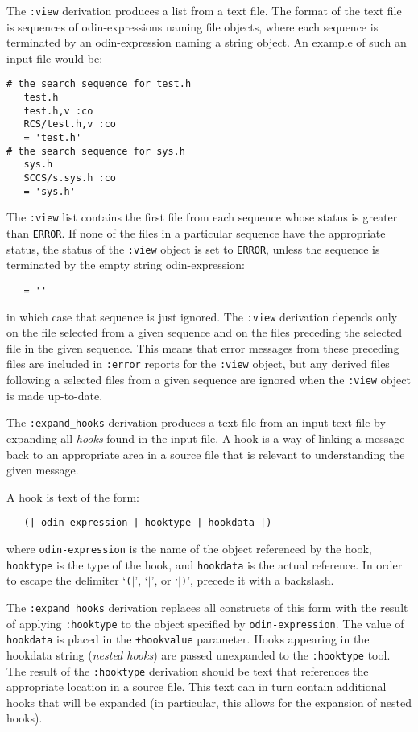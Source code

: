 \documentclass[hidelinks]{report}
\newcommand{\ex}{\tt}   %
\begin{document}
The {\ex :view} derivation produces a list from a text file.
The format of the text file is sequences of odin-expressions
naming file objects, where each sequence is terminated by
an odin-expression naming a string object.
An example of such an input file would be:
\begin{verbatim}
# the search sequence for test.h
   test.h
   test.h,v :co
   RCS/test.h,v :co
   = 'test.h'
# the search sequence for sys.h
   sys.h
   SCCS/s.sys.h :co
   = 'sys.h'
\end{verbatim}
The {\ex :view} list contains the first file from each sequence
whose status is greater than {\ex ERROR}.
If none of the files in a particular sequence have the appropriate
status, the status of the {\ex :view} object is set to {\ex ERROR},
unless the sequence is terminated by the empty string odin-expression:
\begin{verbatim}
   = ''
\end{verbatim}
in which case that sequence is just ignored.
The {\ex :view} derivation depends only on the file selected
from a given sequence and on the files preceding the
selected file in the given sequence.
This means that error messages from these preceding files
are included in {\ex :error} reports for the {\ex :view} object,
but any derived files following a selected files
from a given sequence are ignored when the {\ex :view}
object is made up-to-date.

The {\ex :expand\_hooks} derivation produces a text file
from an input text file by expanding all {\em hooks} found in the input file.
A hook is a way of linking a message back to an appropriate area
in a source file that is relevant to understanding the given message.

A hook is text of the form:
\begin{verbatim}
   (| odin-expression | hooktype | hookdata |)
\end{verbatim}
where {\ex odin-expression} is the name of the object referenced by the hook,
{\ex hooktype} is the type of the hook, and {\ex hookdata} is the actual
reference.
In order to escape the delimiter `{\ex ($|$}', `{\ex $|$}', or `{\ex $|$)}',
precede it with a backslash.

The {\ex :expand\_hooks} derivation
replaces all constructs of this form with the result of
applying {\ex :hooktype} to the object specified by {\ex odin-expression}.
The value of {\ex hookdata} is placed in the {\ex +hookvalue} parameter.
Hooks appearing in the hookdata string ({\em nested hooks}) are passed
unexpanded to the {\ex :hooktype} tool.
The result of the {\ex :hooktype} derivation should be
text that references the appropriate location in a source file.
This text can in turn contain additional hooks that will be expanded
(in particular, this allows for the expansion of nested hooks).
\end{document}
